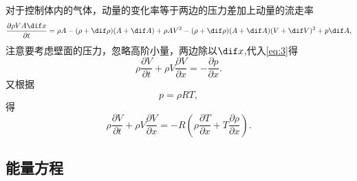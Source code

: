 \documentclass[12pt]{article}
\begin{document}
对于控制体内的气体，动量的变化率等于两边的压力差加上动量的流走率
\begin{equation}
	\frac{\partial \rho VA \dif x}{\partial t} = \rho A  - (\rho + \dif \rho)(A+\dif A) + \rho A V^2 - (\rho + \dif \rho)(A+\dif A)(V+\dif V)^2 + p\dif A,
\end{equation}
注意要考虑壁面的压力，忽略高阶小量，两边除以$\dif x$,代入\cref{eq:3}得
\begin{equation}
	\rho \frac{\partial V}{\partial t}+\rho V \frac{\partial V}{\partial x}=- \frac{\partial p}{\partial x}.
\end{equation}
又根据
\begin{equation}
	p = \rho R T,
\end{equation}
得
\begin{equation}
	\rho \frac{\partial V}{\partial t}+\rho V \frac{\partial V}{\partial x}=-R\left(\rho \frac{\partial T}{\partial x}+T \frac{\partial \rho}{\partial x}\right).
	\label{eq:4}
\end{equation}

\subsection{能量方程}
\end{document}
